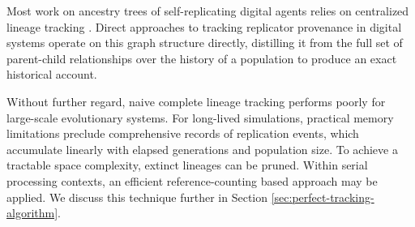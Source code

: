 Most work on ancestry trees of self-replicating digital agents relies on centralized lineage tracking \citep{friggeri2014rumor,cohen1987computer,dolson2024phylotrack}.
Direct approaches to tracking replicator provenance in digital systems operate on this graph structure directly, distilling it from the full set of parent-child relationships over the history of a population to produce an exact historical account.

Without further regard, naive complete lineage tracking performs poorly for large-scale evolutionary systems.
For long-lived simulations, practical memory limitations preclude comprehensive records of replication events, which accumulate linearly with elapsed generations and population size.
To achieve a tractable space complexity, extinct lineages can be pruned.
Within serial processing contexts, an efficient reference-counting based approach may be applied.
We discuss this technique further in Section \ref{sec:perfect-tracking-algorithm}.




